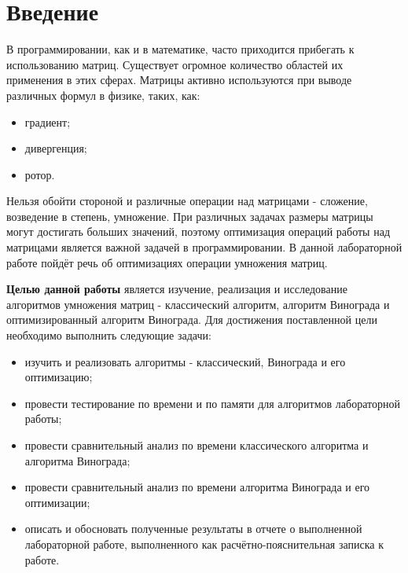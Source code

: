\chapter*{Введение}

В программировании, как и в математике, часто приходится прибегать к использованию матриц. Существует огромное количество областей их применения в этих сферах. Матрицы активно используются при выводе различных формул в физике, таких, как:
\begin{itemize}
    \item градиент;
    \item дивергенция;
    \item ротор.
\end{itemize}

Нельзя обойти стороной и различные операции над матрицами - сложение, возведение в степень, умножение. При различных задачах размеры матрицы могут достигать больших значений, поэтому оптимизация операций работы над матрицами является важной задачей в программировании. В данной лабораторной работе пойдёт речь об оптимизациях операции умножения матриц.


\textbf{Целью данной работы} является изучение, реализация и исследование алгоритмов умножения матриц - классический алгоритм, алгоритм Винограда и оптимизированный алгоритм Винограда. 
Для достижения поставленной цели необходимо выполнить следующие задачи:
\begin{itemize}
	\item изучить и реализовать алгоритмы - классический, Винограда и его оптимизацию;
    \item провести тестирование по времени и по памяти для алгоритмов лабораторной работы;
    \item провести сравнительный анализ по времени классического алгоритма и алгоритма Винограда;
    \item провести сравнительный анализ по времени алгоритма Винограда и его оптимизации;
	\item описать и обосновать полученные результаты в отчете о выполненной лабораторной работе, выполненного как расчётно-пояснительная записка к работе.
\end{itemize}
